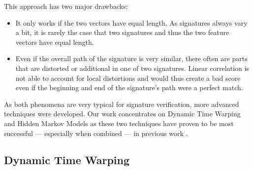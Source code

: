 \documentclass[a4paper, oneside]{csthesis}
\begin{document}
This approach has two major drawbacks:
\begin{itemize}
\item It only works if the two vectors have equal length. As signatures always vary a bit, it is rarely the case that two signatures and thus the two feature vectors have equal length.
\item Even if the overall path of the signature is very similar, there often are parts that are distorted or additional in one of two signatures. Linear correlation is not able to account for local distortions and would thus create a bad score even if the beginning and end of the signature's path were a perfect match.
\end{itemize}

As both phenomena are very typical for signature verification, more advanced techniques were developed. Our work concentrates on Dynamic Time Warping and Hidden Markov Models as these two techniques have proven to be most successful --- especially when combined --- in previous work \cite{fierrez2005line, citeulike:885135, kashi1998hidden, PiyushShanker:2007:OSV:1274199.1274423,martens1996line}.

\newpage
\subsection{Dynamic Time Warping}
\end{document}
